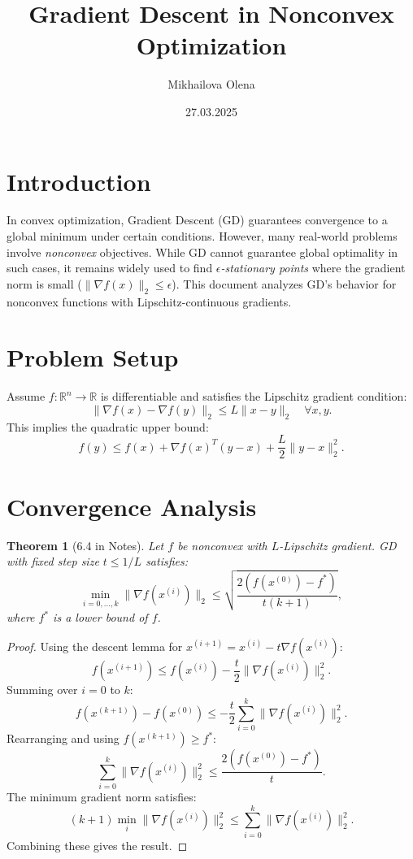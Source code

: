 \documentclass{article}
\title{Gradient Descent in Nonconvex Optimization}
\author{Mikhailova Olena}
\date{27.03.2025}
\newtheorem{theorem}{Theorem}
\begin{document}
\maketitle

\section{Introduction}
In convex optimization, Gradient Descent (GD) guarantees convergence to a global minimum under certain conditions. However, many real-world problems involve \textit{nonconvex} objectives. While GD cannot guarantee global optimality in such cases, it remains widely used to find \textit{$\epsilon$-stationary points} where the gradient norm is small ($\|\nabla f(x)\|_2 \leq \epsilon$). This document analyzes GD's behavior for nonconvex functions with Lipschitz-continuous gradients.

\section{Problem Setup}
Assume $f: \mathbb{R}^n \to \mathbb{R}$ is differentiable and satisfies the Lipschitz gradient condition:
\[
\|\nabla f(x) - \nabla f(y)\|_2 \leq L\|x - y\|_2 \quad \forall x, y.
\]
This implies the quadratic upper bound:
\[
f(y) \leq f(x) + \nabla f(x)^T(y - x) + \frac{L}{2}\|y - x\|_2^2.
\]

\section{Convergence Analysis}
\begin{theorem}[6.4 in Notes]
Let $f$ be nonconvex with $L$-Lipschitz gradient. GD with fixed step size $t \leq 1/L$ satisfies:
\[
\min_{i=0,\dots,k} \|\nabla f(x^{(i)})\|_2 \leq \sqrt{\frac{2(f(x^{(0)}) - f^*)}{t(k+1)}},
\]
where $f^*$ is a lower bound of $f$.
\end{theorem}

\begin{proof}
Using the descent lemma for $x^{(i+1)} = x^{(i)} - t\nabla f(x^{(i)})$:
\[
f(x^{(i+1)}) \leq f(x^{(i)}) - \frac{t}{2}\|\nabla f(x^{(i)})\|_2^2.
\]
Summing over $i=0$ to $k$:
\[
f(x^{(k+1)}) - f(x^{(0)}) \leq -\frac{t}{2}\sum_{i=0}^k \|\nabla f(x^{(i)})\|_2^2.
\]
Rearranging and using $f(x^{(k+1)}) \geq f^*$:
\[
\sum_{i=0}^k \|\nabla f(x^{(i)})\|_2^2 \leq \frac{2(f(x^{(0)}) - f^*)}{t}.
\]
The minimum gradient norm satisfies:
\[
(k+1)\min_{i} \|\nabla f(x^{(i)})\|_2^2 \leq \sum_{i=0}^k \|\nabla f(x^{(i)})\|_2^2.
\]
Combining these gives the result.
\end{proof}
\end{document}
